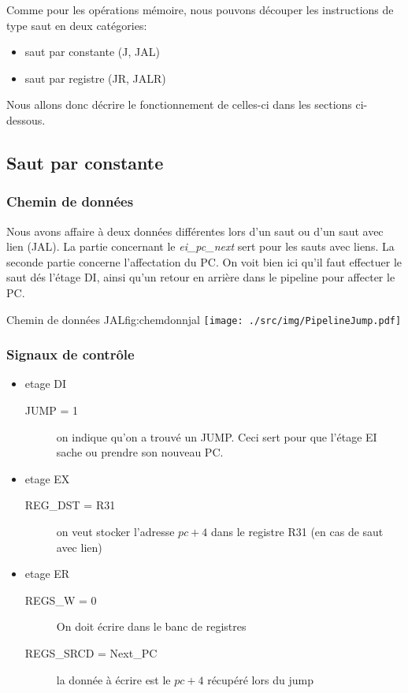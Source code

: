 Comme pour les opérations mémoire, nous pouvons découper les instructions de type saut en deux catégories:
\begin{itemize}
  \item saut par constante (J, JAL)
  \item saut par registre (JR, JALR)
\end{itemize}
Nous allons donc décrire le fonctionnement de celles-ci dans les sections ci-dessous.


\subsection{Saut par constante}
\subsubsection{Chemin de données}
Nous avons affaire à deux données différentes lors d’un saut ou d’un saut avec lien (JAL). La partie concernant le \emph{ei\_pc\_next} sert pour les sauts avec liens.
La seconde partie concerne l'affectation du PC. 
On voit bien ici qu’il faut effectuer le saut dés l’étage DI, ainsi qu’un retour en arrière dans le pipeline pour affecter le PC.
\begin{figureGraphics}{Chemin de données JAL}{fig:chemdonnjal}
  \centering
  \texttt{[image: ./src/img/PipelineJump.pdf]}
\end{figureGraphics}
\subsubsection{Signaux de contrôle}
\begin{itemize}
  \item etage DI
    \begin{description}
      \item[JUMP = 1] on indique qu’on a trouvé un JUMP. Ceci sert pour que l’étage EI sache ou prendre son nouveau PC.
    \end{description}
  \item etage EX
    \begin{description}
      \item[REG\_DST = R31] on veut stocker l'adresse $pc+4$ dans le registre R31 (en cas de saut avec lien)
    \end{description}
  \item etage ER
    \begin{description}
      \item[REGS\_W = 0] On doit écrire dans le banc de registres
      \item[REGS\_SRCD = Next\_PC] la donnée à écrire est le $pc+4$ récupéré lors du jump
    \end{description}
\end{itemize}
